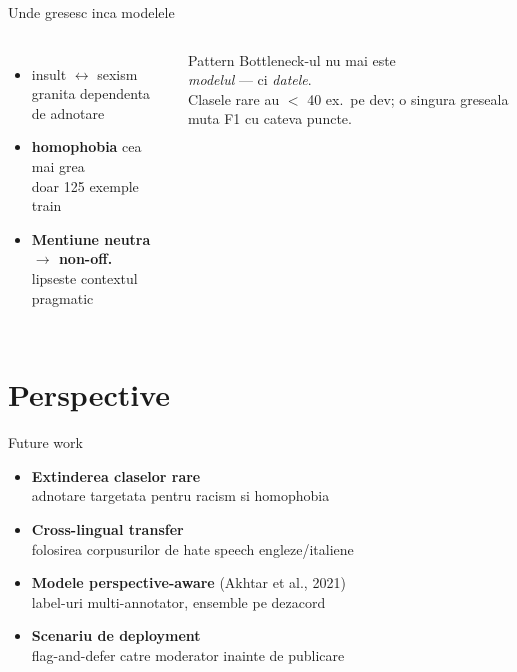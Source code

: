 \documentclass[10pt,aspectratio=169]{beamer}
\newcommand{\sub}[1]{{\small\textcolor{ubdark!70}{#1}}}
\begin{document}
\begin{frame}{Unde gresesc inca modelele}
\begin{columns}[T,onlytextwidth]
\begin{itemize}
  \setlength\itemsep{0.6em}
  \item \alert{insult $\leftrightarrow$ sexism} \\ \sub{granita dependenta de adnotare}
  \item \textbf{homophobia} cea mai grea \\ \sub{doar 125 exemple train}
  \item \textbf{Mentiune neutra $\to$ non-off.} \\ \sub{lipseste contextul pragmatic}
\end{itemize}
\begin{alertblock}{Pattern}
Bottleneck-ul nu mai este \\\emph{modelul} --- ci \emph{datele}.\\[0.3em]
\sub{Clasele rare au $<$ 40 ex.\ pe dev; o singura greseala muta F1 cu cateva puncte.}
\end{alertblock}
\end{columns}
\end{frame}

\section{Perspective}

\begin{frame}{Future work}
\begin{itemize}
  \setlength\itemsep{0.8em}
  \item \textbf{Extinderea claselor rare} \\ \sub{adnotare targetata pentru racism si homophobia}
  \item \textbf{Cross-lingual transfer} \\ \sub{folosirea corpusurilor de hate speech engleze/italiene}
  \item \textbf{Modele perspective-aware} \sub{(Akhtar et al., 2021)} \\ \sub{label-uri multi-annotator, ensemble pe dezacord}
  \item \textbf{Scenariu de deployment} \\ \sub{flag-and-defer catre moderator inainte de publicare}
\end{itemize}
\end{frame}
\end{document}
